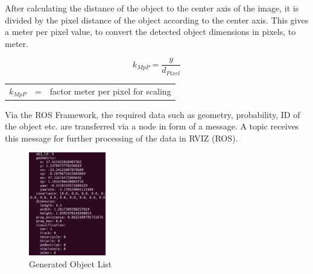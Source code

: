 After calculating the distance of the object to the center axis of the image, it is divided by the pixel distance of the object according to the center axis. This gives a meter per pixel value, to convert the detected object dimensions in pixels, to meter.

\begin{equation}
	k_{MpP} = \frac{y}{d_{Pixel}}
\end{equation}
\begin{table}[!h]
	\begin{center}
		\begin{tabular}{l c l}
			$k_{MpP}$ & = & factor meter per pixel for scaling\\
		\end{tabular}
	\end{center}
\end{table}

Via the \ac{ROS} Framework, the required data such as geometry, probability, \ac{ID} of the object etc. are transferred via a node in form of a message. A topic receives this message for further processing of the data in \ac{RVIZ} (\ac{ROS}).

\begin{figure}[h]
	\centering
	\includegraphics[width=0.3\textwidth]{images/objlist_output.png}
	\caption{Generated Object List}
	\label{fig:ros_outout}
\end{figure}